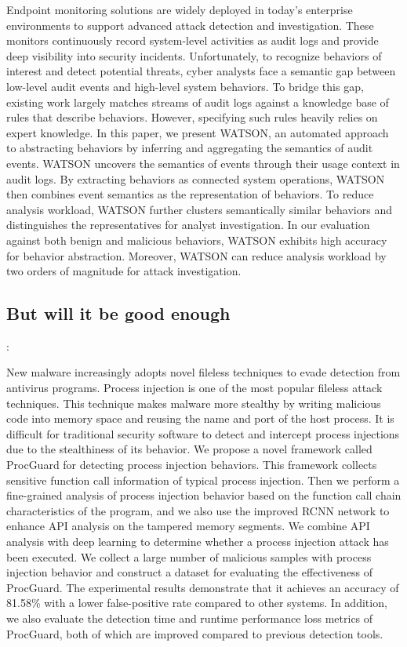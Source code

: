 \documentclass{article}
\begin{document}
Endpoint monitoring solutions are widely deployed in today's enterprise environments to support advanced attack detection and investigation. These monitors continuously record system-level activities as audit logs and provide deep visibility into security incidents. Unfortunately, to recognize behaviors of interest and detect potential threats, cyber analysts face a semantic gap between low-level audit events and high-level system behaviors. To bridge this gap, existing work largely matches streams of audit logs against a knowledge base of rules that describe behaviors. However, specifying such rules heavily relies on expert knowledge. In this paper, we present WATSON, an automated approach to abstracting behaviors by inferring and aggregating the semantics of audit events. WATSON uncovers the semantics of events through their usage context in audit logs. By extracting behaviors as connected system operations, WATSON then combines event semantics as the representation of behaviors. To reduce analysis workload, WATSON further clusters semantically similar behaviors and distinguishes the representatives for analyst investigation. In our evaluation against both benign and malicious behaviors, WATSON exhibits high accuracy for behavior abstraction. Moreover, WATSON can reduce analysis workload by two orders of magnitude for attack investigation.

\subsection{But will it be good enough}

\textbf{}: \textcite{Wang:2022}

New malware increasingly adopts novel fileless techniques to evade detection from antivirus programs. Process injection is one of the most popular fileless attack techniques. This technique makes malware more stealthy by writing malicious code into memory space and reusing the name and port of the host process. It is difficult for traditional security software to detect and intercept process injections due to the stealthiness of its behavior. We propose a novel framework called ProcGuard for detecting process injection behaviors. This framework collects sensitive function call information of typical process injection. Then we perform a fine-grained analysis of process injection behavior based on the function call chain characteristics of the program, and we also use the improved RCNN network to enhance API analysis on the tampered memory segments. We combine API analysis with deep learning to determine whether a process injection attack has been executed. We collect a large number of malicious samples with process injection behavior and construct a dataset for evaluating the effectiveness of ProcGuard. The experimental results demonstrate that it achieves an accuracy of 81.58\% with a lower false-positive rate compared to other systems. In addition, we also evaluate the detection time and runtime performance loss metrics of ProcGuard, both of which are improved compared to previous detection tools.
\end{document}
